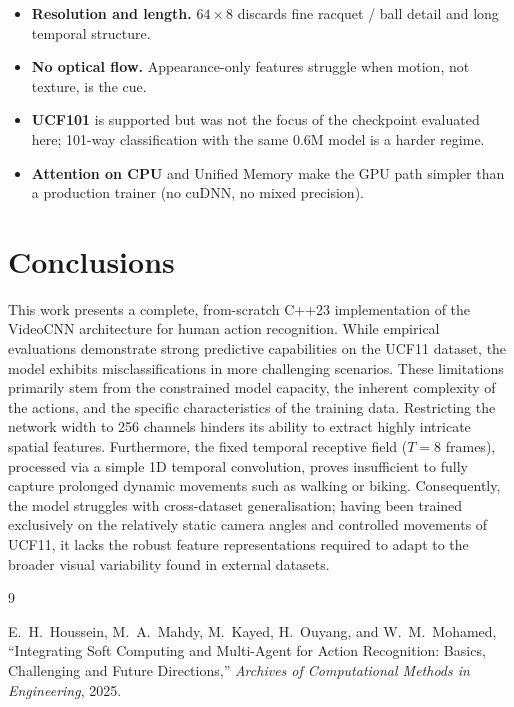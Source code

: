 \documentclass[11pt,a4paper]{article}
\begin{document}
\begin{itemize}
  \item \textbf{Resolution and length.} $64\times 8$ discards fine
        racquet / ball detail and long temporal structure.
  \item \textbf{No optical flow.} Appearance-only features struggle
        when motion, not texture, is the cue.
  \item \textbf{UCF101} is supported but was not the focus of the
        checkpoint evaluated here; 101-way classification with the same
        0.6M model is a harder regime.
  \item \textbf{Attention on CPU} and Unified Memory make the GPU path
        simpler than a production trainer (no cuDNN, no mixed precision).
\end{itemize}

\section{Conclusions}
\label{sec:conc}

This work presents a complete, from-scratch C++23 implementation of the VideoCNN architecture for human action recognition. While empirical evaluations demonstrate strong predictive capabilities on the UCF11 dataset, the model exhibits misclassifications in more challenging scenarios. These limitations primarily stem from the constrained model capacity, the inherent complexity of the actions, and the specific characteristics of the training data. Restricting the network width to 256 channels hinders its ability to extract highly intricate spatial features. Furthermore, the fixed temporal receptive field ($T=8$ frames), processed via a simple 1D temporal convolution, proves insufficient to fully capture prolonged dynamic movements such as walking or biking. Consequently, the model struggles with cross-dataset generalisation; having been trained exclusively on the relatively static camera angles and controlled movements of UCF11, it lacks the robust feature representations required to adapt to the broader visual variability found in external datasets.

\begin{thebibliography}{9}

E.~H.~Houssein, M.~A.~Mahdy, M.~Kayed, H.~Ouyang, and W.~M.~Mohamed,
``Integrating Soft Computing and Multi-Agent for Action Recognition: Basics, Challenging and Future Directions,''
\emph{Archives of Computational Methods in Engineering}, 2025.

\end{thebibliography}
\end{document}
